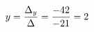 \documentclass[preview]{standalone}
\begin{document}
\begin{align*}
\special{dvisvgm:raw <g id='unique000'>}y = \frac{\Delta_y}{\Delta} = \frac{-42}{-21} = 2\special{dvisvgm:raw </g>}
\end{align*}
\end{document}
